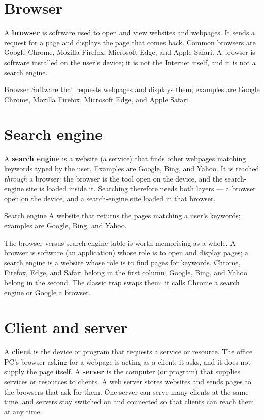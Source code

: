 \section{Browser}
A \textbf{browser} is software used to open and view websites and webpages.
It sends a request for a page and displays the page that comes back. Common
browsers are Google Chrome, Mozilla Firefox, Microsoft Edge, and Apple
Safari. A browser is software installed on the user's device; it is not the
Internet itself, and it is not a search engine.

\begin{definitionbox}{Browser}
Software that requests webpages and displays them; examples are Google
Chrome, Mozilla Firefox, Microsoft Edge, and Apple Safari.
\end{definitionbox}

\section{Search engine}
A \textbf{search engine} is a website (a service) that finds other webpages
matching keywords typed by the user. Examples are Google, Bing, and Yahoo.
It is reached \emph{through} a browser: the browser is the tool open on the
device, and the search-engine site is loaded inside it. Searching therefore
needs both layers --- a browser open on the device, and a search-engine site
loaded in that browser.

\begin{definitionbox}{Search engine}
A website that returns the pages matching a user's keywords; examples are
Google, Bing, and Yahoo.
\end{definitionbox}

The browser-versus-search-engine table is worth memorising as a whole. A
browser is software (an application) whose role is to open and display pages;
a search engine is a website whose role is to find pages for keywords. Chrome,
Firefox, Edge, and Safari belong in the first column; Google, Bing, and
Yahoo belong in the second. The classic trap swaps them: it calls Chrome a
search engine or Google a browser.

\section{Client and server}
A \textbf{client} is the device or program that requests a service or
resource. The office PC's browser asking for a webpage is acting as a
client: it asks, and it does not supply the page itself. A \textbf{server}
is the computer (or program) that supplies services or resources to clients.
A web server stores websites and sends pages to the browsers that ask for
them. One server can serve many clients at the same time, and servers stay
switched on and connected so that clients can reach them at any time.

